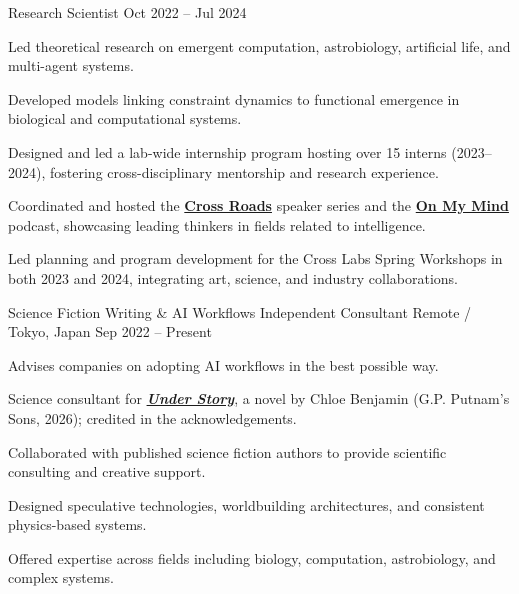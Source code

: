 \begin{cventries}
\cvsubposition
  {Research Scientist}
  {Oct 2022 -- Jul 2024}
  {
    \begin{cvitems}
      \item {Led theoretical research on emergent computation, astrobiology, artificial life, and multi-agent systems.}
      \item {Developed models linking constraint dynamics to functional emergence in biological and computational systems.}
      \item {Designed and led a lab-wide internship program hosting over 15 interns (2023–2024), fostering cross-disciplinary mentorship and research experience.}
      \item {Coordinated and hosted the \href{https://www.youtube.com/watch?v=bgB8e3Goa2o&list=PLODRPaSTLJCdZDKuvfFFLRztSUYWQ2dkD}{\textbf{Cross Roads}} speaker series and the \href{https://www.youtube.com/watch?v=u0RD11jJcVs&list=PLODRPaSTLJCeDbLrnbfvX_rMgPrJwCu6t}{\textbf{On My Mind}} podcast, showcasing leading thinkers in fields related to intelligence.}
      \item {Led planning and program development for the Cross Labs Spring Workshops in both 2023 and 2024, integrating art, science, and industry collaborations.}
    \end{cvitems}
  }

\cventry
  {Science Fiction Writing \& AI Workflows}
  {Independent Consultant}
  {Remote / Tokyo, Japan}
  {Sep 2022 -- Present}
  {
    \begin{cvitems}
      \item {Advises companies on adopting AI workflows in the best possible way.}
      \item {Science consultant for \href{https://www.chloebenjaminbooks.com/under-story}{\textbf{\textit{Under Story}}}, a novel by Chloe Benjamin (G.P. Putnam's Sons, 2026); credited in the acknowledgements.}
      \item {Collaborated with published science fiction authors to provide scientific consulting and creative support.}
      \item {Designed speculative technologies, worldbuilding architectures, and consistent physics-based systems.}
      \item {Offered expertise across fields including biology, computation, astrobiology, and complex systems.}
    \end{cvitems}
  }


\end{cventries}
